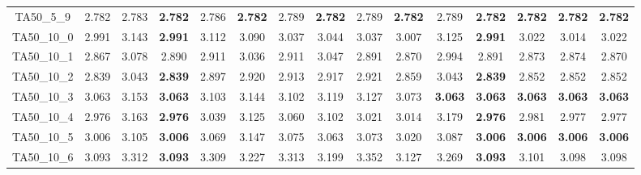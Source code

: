 \begin{tabular}{cc||ccccccccccccc}
TA50\_5\_9         & 2.782            & 2.783            & {\bf 2.782}      & 2.786            & {\bf 2.782}      & 2.789            & {\bf 2.782}      & 2.789            & {\bf 2.782}      & 2.789            & {\bf 2.782}      & {\bf 2.782}      & {\bf 2.782}      & {\bf 2.782}     \\ 
TA50\_10\_0        & 2.991            & 3.143            & {\bf 2.991}      & 3.112            & 3.090            & 3.037            & 3.044            & 3.037            & 3.007            & 3.125            & {\bf 2.991}      & 3.022            & 3.014            & 3.022           \\ 
TA50\_10\_1        & 2.867            & 3.078            & 2.890            & 2.911            & 3.036            & 2.911            & 3.047            & 2.891            & 2.870            & 2.994            & 2.891            & 2.873            & 2.874            & 2.870           \\ 
TA50\_10\_2        & 2.839            & 3.043            & {\bf 2.839}      & 2.897            & 2.920            & 2.913            & 2.917            & 2.921            & 2.859            & 3.043            & {\bf 2.839}      & 2.852            & 2.852            & 2.852           \\ 
TA50\_10\_3        & 3.063            & 3.153            & {\bf 3.063}      & 3.103            & 3.144            & 3.102            & 3.119            & 3.127            & 3.073            & {\bf 3.063}      & {\bf 3.063}      & {\bf 3.063}      & {\bf 3.063}      & {\bf 3.063}     \\ 
TA50\_10\_4        & 2.976            & 3.163            & {\bf 2.976}      & 3.039            & 3.125            & 3.060            & 3.102            & 3.021            & 3.014            & 3.179            & {\bf 2.976}      & 2.981            & 2.977            & 2.977           \\ 
TA50\_10\_5        & 3.006            & 3.105            & {\bf 3.006}      & 3.069            & 3.147            & 3.075            & 3.063            & 3.073            & 3.020            & 3.087            & {\bf 3.006}      & {\bf 3.006}      & {\bf 3.006}      & {\bf 3.006}     \\ 
TA50\_10\_6        & 3.093            & 3.312            & {\bf 3.093}      & 3.309            & 3.227            & 3.313            & 3.199            & 3.352            & 3.127            & 3.269            & {\bf 3.093}      & 3.101            & 3.098            & 3.098           \\ 

\end{tabular}
